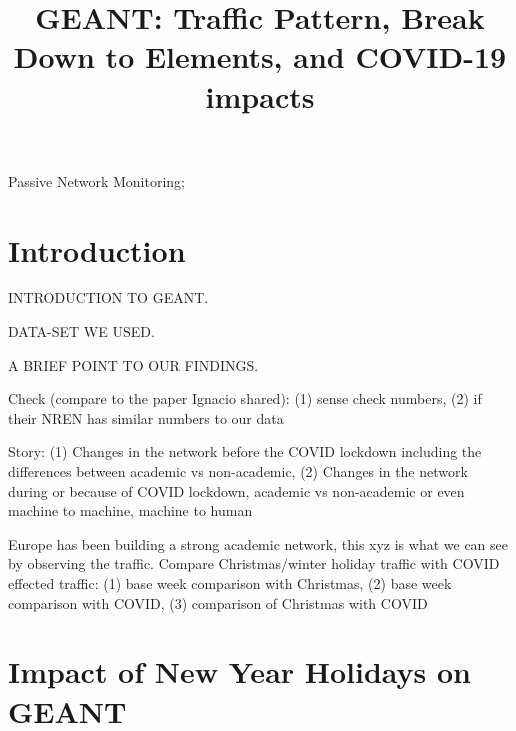 \documentclass[10pt, journal, letterpaper]{IEEEtran}
\begin{document}
\title{GEANT: Traffic Pattern, Break Down to Elements, and COVID-19 impacts}
\author{}
\maketitle	
\begin{abstract}
\end{abstract}	
\begin{IEEEkeywords} 
    Passive Network Monitoring;
\end{IEEEkeywords}

\section{Introduction}
INTRODUCTION TO GEANT.

DATA-SET WE USED.

A BRIEF POINT TO OUR FINDINGS.

Check (compare to the paper Ignacio shared): (1) sense check numbers, (2) if their NREN has similar numbers to our data

Story: (1) Changes in the network before the COVID lockdown including the differences between academic vs non-academic, (2) Changes in the network during or because of COVID lockdown, academic vs non-academic or even machine to machine, machine to human

Europe has been building a strong academic network, this xyz is what we can see by observing the traffic. Compare Christmas/winter holiday traffic with COVID effected traffic: (1) base week comparison with Christmas, (2) base week comparison with COVID, (3) comparison of Christmas with COVID

\section{Impact of New Year Holidays on GEANT}
\end{document}
